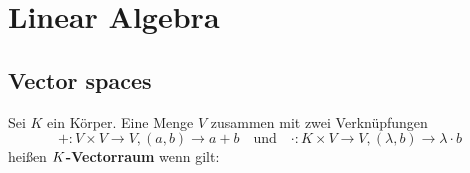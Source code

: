 \section{Linear Algebra}
\label{sec:linalg}
\lipsum[1-2]

\subsection{Vector spaces}
\lipsum[3-4]
\begin{tcolorbox}[TUMBox=TUMGreen, title=Definition, breakable]
  Sei $K$ ein Körper. Eine Menge $V$ zusammen mit zwei Verknüpfungen
  \begin{equation}
    +: V \times V \rightarrow V, (a,b) \rightarrow a+b \quad\text{und}\quad
    \cdot: K \times V \rightarrow V, (\lambda,b) \rightarrow \lambda\cdot b
  \end{equation}
  heißen $\boldmath{K}$\textbf{-Vectorraum} wenn gilt:\par


\end{tcolorbox}
